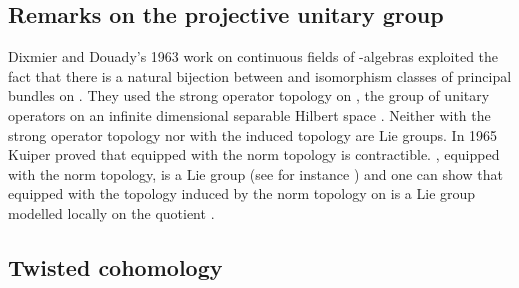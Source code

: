 \documentclass[a4paper,reqno]{amsart}
\theoremstyle{plain}
\theoremstyle{definition}
\theoremstyle{remark}
\numberwithin{equation}{section}
\numberwithin{figure}{section}
\providecommand{\RR}{{\mathbb R}}
\providecommand{\ZZ}{{\mathbb Z}}
\providecommand{\<}{\langle}
\renewcommand{\>}{\rangle}
\begin{document}
     
\subsection{Remarks on the projective unitary group} 

Dixmier and Douady's 1963 work on continuous fields of 
\coordHE{}-algebras exploited the fact that there is a 
natural bijection between \myHighlight{$H^3(M;\ZZ)$}\coordHE{} and isomorphism 
classes of principal \coordHE{} bundles on \coordHE{}.  They used 
the strong operator topology on \coordHE{}, the group of unitary 
operators on an infinite dimensional separable Hilbert space 
\coordHE{}.  Neither \coordHE{} with the 
strong operator topology nor \coordHE{} with the 
induced topology are Lie groups.     
In 1965 Kuiper proved that \coordHE{} 
equipped with the norm topology is contractible.  
\coordHE{}, equipped with the norm topology, is a Lie group 
(see for instance \cite{Milnor}) 
and one can show that \coordHE{} equipped with the 
topology induced by the norm topology on \coordHE{} 
is a Lie group modelled locally on the quotient 
\myHighlight{$Lie(U(\mathcal{H}))/i\RR$}\coordHE{} \cite{Tol}. 


\subsection{Twisted cohomology} 
\end{document}
